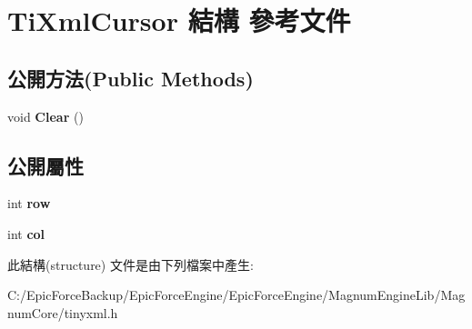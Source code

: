 \hypertarget{struct_ti_xml_cursor}{}\section{Ti\+Xml\+Cursor 結構 參考文件}
\label{struct_ti_xml_cursor}
\subsection*{公開方法(Public Methods)}
\begin{DoxyCompactItemize}
\item 
void {\bfseries Clear} ()\hypertarget{struct_ti_xml_cursor_a1e6fa622b59dafb71b6efe595105dcdd}{}\label{struct_ti_xml_cursor_a1e6fa622b59dafb71b6efe595105dcdd}

\end{DoxyCompactItemize}
\subsection*{公開屬性}
\begin{DoxyCompactItemize}
\item 
int {\bfseries row}\hypertarget{struct_ti_xml_cursor_a5b54dd949820c2db061e2be41f3effb3}{}\label{struct_ti_xml_cursor_a5b54dd949820c2db061e2be41f3effb3}

\item 
int {\bfseries col}\hypertarget{struct_ti_xml_cursor_a5694d7ed2c4d20109d350c14c417969d}{}\label{struct_ti_xml_cursor_a5694d7ed2c4d20109d350c14c417969d}

\end{DoxyCompactItemize}


此結構(structure) 文件是由下列檔案中產生\+:\begin{DoxyCompactItemize}
\item 
C\+:/\+Epic\+Force\+Backup/\+Epic\+Force\+Engine/\+Epic\+Force\+Engine/\+Magnum\+Engine\+Lib/\+Magnum\+Core/tinyxml.\+h\end{DoxyCompactItemize}

